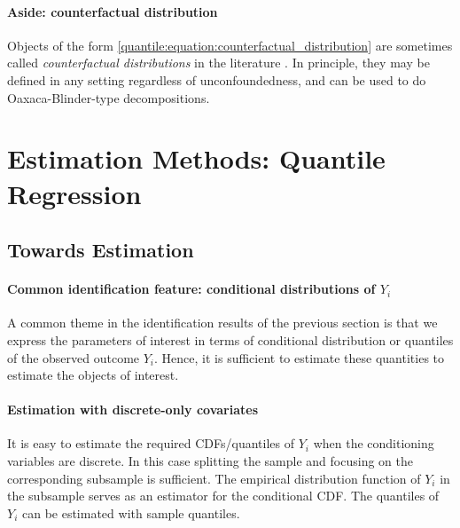 \paragraph{Aside: counterfactual distribution}

Objects of the form \eqref{quantile:equation:counterfactual_distribution} are sometimes called \emph{counterfactual distributions} in the literature \citep{Machado2005CounterfactualDecompositionChanges, Chernozhukov2013b}. In principle, they may be defined in any setting regardless of unconfoundedness, and can be used to do Oaxaca-Blinder-type decompositions. 
   
%
%
 
  
\newpage 

\section{Estimation Methods: Quantile  Regression}
 
 \subsection{Towards Estimation}
 
 \paragraph{Common identification feature: conditional distributions of $Y_i$}
 
 A common theme in the identification results of the previous section is that we express the parameters of interest in terms of conditional distribution or quantiles of the observed outcome $Y_i$.  Hence, it is sufficient to estimate these quantities to estimate the objects of interest. 
  

\paragraph{Estimation with discrete-only covariates}

It is easy to estimate the required CDFs/quantiles of $Y_i$ when the conditioning variables are discrete. In this case splitting the sample and focusing on the corresponding subsample is sufficient.   The empirical distribution function of $Y_i$ in the subsample serves as an estimator for the conditional CDF. The quantiles of $Y_i$ can be estimated with sample quantiles.

